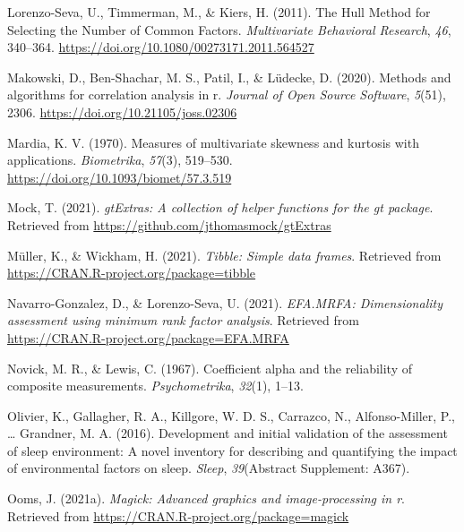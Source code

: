 \documentclass[
  english,
  man]{apa6}
\newlength{\cslhangindent}
\newlength{\cslentryspacingunit} %
\newenvironment{CSLReferences}[2] %
 {%
  \setlength{\parindent}{0pt}
  \ifodd #1
  \let\oldpar\par
  \def\par{\hangindent=\cslhangindent\oldpar}
  \fi
  \setlength{\parskip}{#2\cslentryspacingunit}
 }%
 {}
\begin{document}
\begin{CSLReferences}{1}{0}
\leavevmode{}%
Lorenzo-Seva, U., Timmerman, M., \& Kiers, H. (2011). The {Hull Method} for {Selecting} the {Number} of {Common Factors}. \emph{Multivariate Behavioral Research}, \emph{46}, 340--364. \url{https://doi.org/10.1080/00273171.2011.564527}

\leavevmode{}%
Makowski, D., Ben-Shachar, M. S., Patil, I., \& Lüdecke, D. (2020). Methods and algorithms for correlation analysis in r. \emph{Journal of Open Source Software}, \emph{5}(51), 2306. \url{https://doi.org/10.21105/joss.02306}

\leavevmode{}%
Mardia, K. V. (1970). Measures of multivariate skewness and kurtosis with applications. \emph{Biometrika}, \emph{57}(3), 519--530. \url{https://doi.org/10.1093/biomet/57.3.519}

\leavevmode{}%
Mock, T. (2021). \emph{gtExtras: A collection of helper functions for the gt package}. Retrieved from \url{https://github.com/jthomasmock/gtExtras}

\leavevmode{}%
Müller, K., \& Wickham, H. (2021). \emph{Tibble: Simple data frames}. Retrieved from \url{https://CRAN.R-project.org/package=tibble}

\leavevmode{}%
Navarro-Gonzalez, D., \& Lorenzo-Seva, U. (2021). \emph{EFA.MRFA: Dimensionality assessment using minimum rank factor analysis}. Retrieved from \url{https://CRAN.R-project.org/package=EFA.MRFA}

\leavevmode{}%
Novick, M. R., \& Lewis, C. (1967). Coefficient alpha and the reliability of composite measurements. \emph{Psychometrika}, \emph{32}(1), 1--13.

\leavevmode{}%
Olivier, K., Gallagher, R. A., Killgore, W. D. S., Carrazco, N., Alfonso-Miller, P., \ldots{} Grandner, M. A. (2016). Development and initial validation of the assessment of sleep environment: A novel inventory for describing and quantifying the impact of environmental factors on sleep. \emph{Sleep}, \emph{39}(Abstract Supplement: A367).

\leavevmode{}%
Ooms, J. (2021a). \emph{Magick: Advanced graphics and image-processing in r}. Retrieved from \url{https://CRAN.R-project.org/package=magick}


\end{CSLReferences}
\end{document}
